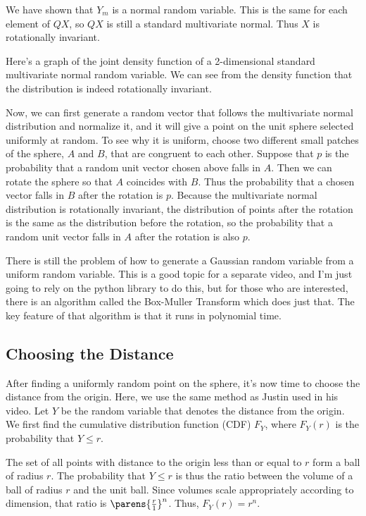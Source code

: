 \documentclass{article}
\begin{document}
We have shown that $Y_m$ is a normal random variable. This is the same for each element of $QX$, so $QX$ is still a standard multivariate normal. Thus $X$ is rotationally invariant.

Here's a graph of the joint density function of a 2-dimensional standard multivariate normal random variable. We can see from the density function that the distribution is indeed rotationally invariant.


Now, we can first generate a random vector that follows the multivariate normal distribution and normalize it, and it will give a point on the unit sphere selected uniformly at random. To see why it is uniform, choose two different small patches of the sphere, $A$ and $B$, that are congruent to each other. Suppose that $p$ is the probability that a random unit vector chosen above falls in $A$. Then we can rotate the sphere so that $A$ coincides with $B$. Thus the probability that a chosen vector falls in $B$ after the rotation is $p$. Because the multivariate normal distribution is rotationally invariant, the distribution of points after the rotation is the same as the distribution before the rotation, so the probability that a random unit vector falls in $A$ after the rotation is also $p$.

There is still the problem of how to generate a Gaussian random variable from a uniform random variable. This is a good topic for a separate video, and I'm just going to rely on the python library to do this, but for those who are interested, there is an algorithm called the Box-Muller Transform which does just that. The key feature of that algorithm is that it runs in polynomial time.

\subsection{Choosing the Distance}

After finding a uniformly random point on the sphere, it's now time to choose the distance from the origin. Here, we use the same method as Justin used in his video. Let $Y$ be the random variable that denotes the distance from the origin. We first find the cumulative distribution function (CDF) $F_Y$, where $F_Y(r)$ is the probability that $Y \leq r$.

The set of all points with distance to the origin less than or equal to $r$ form a ball of radius $r$. The probability that $Y \leq r$ is thus the ratio between the volume of a ball of radius $r$ and the unit ball. Since volumes scale appropriately according to dimension, that ratio is $\parens{\frac{r}{1}}^n$. Thus, $F_Y(r) = r^n$.
\end{document}
